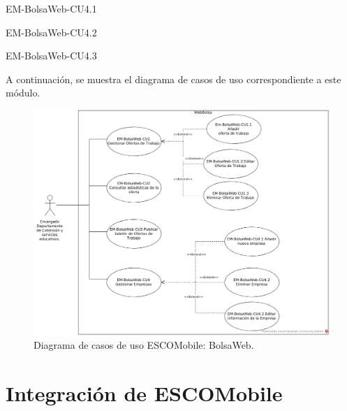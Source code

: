 \begin{requisitos}{EM-BolsaWeb-CU4.1}
\end{requisitos}

\begin{requisitos}{EM-BolsaWeb-CU4.2}
\end{requisitos}

\begin{requisitos}{EM-BolsaWeb-CU4.3}
\end{requisitos}

\noindent
A continuación, se muestra el diagrama de casos de uso correspondiente a este módulo.

\pagebreak
\begin{figure}[htbp!]
	\centering
	\includegraphics[width=1\textwidth]{images/casos/WebBolsa}
	\caption{Diagrama de casos de uso ESCOMobile: BolsaWeb.}
\end{figure}




\section{Integración de ESCOMobile}

